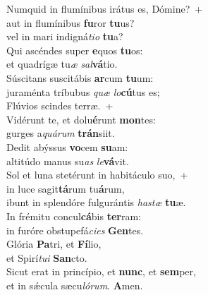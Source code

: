 \evenverse Numquid in flumínibus irátus es, Dómine?~+\\\evenverse  aut in flumínibus \textbf{fu}ror \textbf{tu}us?~\*\\
\evenverse vel in mari indigná\textit{ti}\textit{o} \textbf{tu}a?\\
\oddverse Qui ascéndes super \textbf{e}quos \textbf{tu}os:~\*\\
\oddverse et quadrígæ tu\textit{æ} \textit{sal}\textbf{vá}tio.\\
\evenverse Súscitans suscitábis \textbf{ar}cum \textbf{tu}um:~\*\\
\evenverse juraménta tríbubus \textit{quæ} \textit{lo}\textbf{cú}tus es;\\
\oddverse Flúvios scindes terræ.~+\\
\oddverse  Vidérunt te, et dolu\textbf{é}runt \textbf{mon}tes:~\*\\
\oddverse gurges a\textit{quá}\textit{rum} \textbf{trán}siit.\\
\evenverse Dedit abýssus \textbf{vo}cem \textbf{su}am:~\*\\
\evenverse altitúdo manus su\textit{as} \textit{le}\textbf{vá}vit.\\
\oddverse Sol et luna stetérunt in habitáculo suo,~+\\
\oddverse  in luce sagit\textbf{tá}rum tu\textbf{á}rum,~\*\\
\oddverse ibunt in splendóre fulgurántis \textit{ha}\textit{stæ} \textbf{tu}æ.\\
\evenverse In frémitu concul\textbf{cá}bis \textbf{ter}ram:~\*\\
\evenverse in furóre obstupefá\textit{ci}\textit{es} \textbf{Gen}tes.\\
\oddverse Glória \textbf{Pa}tri, et \textbf{Fí}lio,~\*\\
\oddverse et Spirí\textit{tu}\textit{i} \textbf{San}cto.\\
\evenverse Sicut erat in princípio, et \textbf{nunc}, et \textbf{sem}per,~\*\\
\evenverse et in sǽcula sæcu\textit{ló}\textit{rum}. \textbf{A}men.\\
